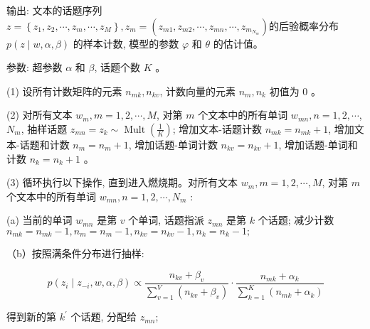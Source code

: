 \documentclass[10pt]{article}
\begin{document}
\begin{CJK*}{UTF8}{bsmi}
输出: 文本的话题序列 $z=\left\{z_{1}, z_{2}, \cdots, z_{m}, \cdots, z_{M}\right\}, z_{m}=\left(z_{m 1}, z_{m 2}, \cdots, z_{m n}, \cdots, z_{m_{N_{m}}}\right)$的后验概率分布 $p(z \mid w, \alpha, \beta)$ 的样本计数, 模型的参数 $\varphi$ 和 $\theta$ 的估计值。

参数: 超参数 $\alpha$ 和 $\beta$, 话题个数 $K$ 。

(1) 设所有计数矩阵的元素 $n_{m k}, n_{k v}$, 计数向量的元素 $n_{m}, n_{k}$ 初值为 0 。

(2) 对所有文本 $w_{m}, m=1,2, \cdots, M$, 对第 $m$ 个文本中的所有单词 $w_{m n}, n=1,2, \cdots$, $N_{m}$, 抽样话题 $z_{m n}=z_{k} \sim \operatorname{Mult}\left(\frac{1}{K}\right)$; 增加文本-话题计数 $n_{m k}=n_{m k}+1$, 增加文本-话题和计数 $n_{m}=n_{m}+1$, 增加话题-单词计数 $n_{k v}=n_{k v}+1$, 增加话题-单词和计数 $n_{k}=n_{k}+1$ 。

(3) 循环执行以下操作, 直到进入燃烧期。对所有文本 $w_{m}, m=1,2, \cdots, M$, 对第 $m$个文本中的所有单词 $w_{m n}, n=1,2, \cdots, N_{m}$ :

(a) 当前的单词 $w_{m n}$ 是第 $v$ 个单词, 话题指派 $z_{m n}$ 是第 $k$ 个话题; 减少计数 $n_{m k}=n_{m k}-1, n_{m}=n_{m}-1, n_{k v}=n_{k v}-1, n_{k}=n_{k}-1 ;$

（b）按照满条件分布进行抽样:

$$
p\left(z_{i} \mid z_{-i}, w, \alpha, \beta\right) \propto \frac{n_{k v}+\beta_{v}}{\sum_{v=1}^{V}\left(n_{k v}+\beta_{v}\right)} \cdot \frac{n_{m k}+\alpha_{k}}{\sum_{k=1}^{K}\left(n_{m k}+\alpha_{k}\right)}
$$

得到新的第 $k^{\prime}$ 个话题, 分配给 $z_{m n}$;


\end{CJK*}
\end{document}
